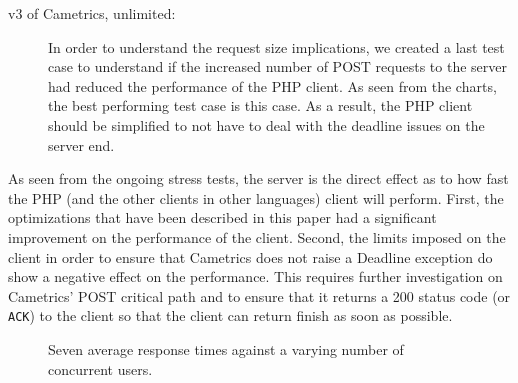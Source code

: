 \documentclass[10pt,a4paper,english]{article}
\begin{document}
\begin{description}
\item[{v3 of Cametrics, unlimited:}] \leavevmode 
In order to understand the request size implications, we created a last test case to understand if the increased number of POST requests to the server had reduced the performance of the PHP client. As seen from the charts, the best performing test case is this case. As a result, the PHP client should be simplified to not have to deal with the deadline issues on the server end.

\end{description}

As seen from the ongoing stress tests, the server is the direct effect as to how fast the PHP (and the other clients in other languages) client will perform. First, the optimizations that have been described in this paper had a significant improvement on the performance of the client. Second, the limits imposed on the client in order to ensure that Cametrics does not raise a Deadline exception do show a negative effect on the performance. This requires further investigation on Cametrics' POST critical path and to ensure that it returns a 200 status code (or \texttt{ACK}) to the client so that the client can return finish as soon as possible.
\begin{figure}[htbp]
\centering

\caption{Seven average response times against a varying number of concurrent users.}\end{figure}
\end{document}
